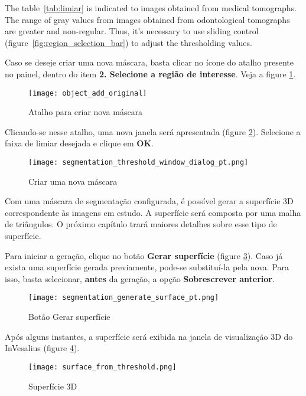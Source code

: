 The table~\ref{tab:limiar} is indicated to images obtained from medical tomographs. The range of gray values from images obtained from odontological tomographs are greater and non-regular. Thus, it's necessary to use sliding control (figure~\ref{fig:region_selection_bar}) to adjust the thresholding values.

Caso se deseje criar uma nova máscara, basta clicar no ícone do atalho presente no painel, dentro
do item \textbf{2. Selecione a região de interesse}. Veja a figure \ref{fig:shortcut_new_mask}.

\begin{figure}[!htb]
\centering
\texttt{[image: object\_add\_original]}
\caption{Atalho para criar nova máscara}
\label{fig:shortcut_new_mask}
\end{figure}

Clicando-se nesse atalho, uma nova janela será apresentada (figure \ref{fig:create_new_mask}).
Selecione a faixa de limiar desejada e clique em \textbf{OK}.

\begin{figure}[!htb]
\centering
\texttt{[image: segmentation\_threshold\_window\_dialog\_pt.png]}
\caption{Criar uma nova máscara}
\label{fig:create_new_mask}
\end{figure}

\newpage

Com uma máscara de segmentação configurada, é possível gerar a superfície 3D correspondente
às imagens em estudo. A superfície será composta por uma malha de triângulos. O próximo capítulo
trará maiores detalhes sobre esse tipo de superfície.

Para iniciar a geração, clique no botão \textbf{Gerar superfície} (figure \ref{fig:generate_surface}).
Caso já exista uma superfície gerada previamente, pode-se substituí-la pela nova. Para isso, basta
selecionar, \textbf{antes} da geração, a opção \textbf{Sobrescrever anterior}.

\begin{figure}[!htb]
\centering
\texttt{[image: segmentation\_generate\_surface\_pt.png]}
\caption{Botão Gerar superfície}
\label{fig:generate_surface}
\end{figure}

Após alguns instantes, a superfície será exibida na janela de visualização 3D do InVesalius
(figure \ref{fig:surface}).

\begin{figure}[!htb]
\centering
\texttt{[image: surface\_from\_threshold.png]}
\caption{Superfície 3D}
\label{fig:surface}
\end{figure}
 



